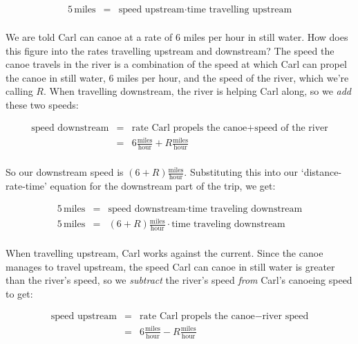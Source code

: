 {\[\begin{array}{rcl}
5 \, \text{miles} & = & \text{speed upstream} \cdot \text{time travelling upstream} \\ \end{array} \]

We are told Carl can canoe at a  rate of $6$ miles per hour in still water.  How does this figure into the rates travelling upstream and downstream?  The speed the canoe travels in the river is a combination of the speed at which Carl can propel the canoe in still water, 6 miles per hour,  and the speed of the river, which we're calling $R$. When travelling downstream, the river is helping Carl along, so we \textit{add} these two speeds: 

\[ \begin{array}{rcl}

\text{speed downstream} & = & \text{rate Carl propels the canoe} + \text{speed of the river} \\

 & = & 6 \frac{\text{miles}}{\text{hour}} + R \frac{\text{miles}}{\text{hour}} \\ \end{array} \]
 
 So our downstream speed is $(6+R) \frac{\text{miles}}{\text{hour}}$.  Substituting this into our `distance-rate-time' equation for the downstream part of the trip, we get:
 
 \[ \begin{array}{rcl}

5 \, \text{miles} & = & \text{speed downstream} \cdot \text{time traveling downstream} \\ 

5 \, \text{miles} & = & (6+R) \frac{\text{miles}}{\text{hour}} \cdot \text{time traveling downstream} \\ 	\end{array} \]

 When travelling upstream, Carl works against the current.  Since the canoe manages to travel upstream,  the speed Carl can canoe in still water is greater than the river's speed, so we \textit{subtract} the river's speed \textit{from} Carl's canoeing speed to get:
 
\drawexampleline

 \[ \begin{array}{rcl}

\text{speed upstream} & = & \text{rate Carl propels the canoe} - \text{river speed} \\

 & = & 6 \frac{\text{miles}}{\text{hour}} - R \frac{\text{miles}}{\text{hour}} \\ \end{array} \]
 
}
